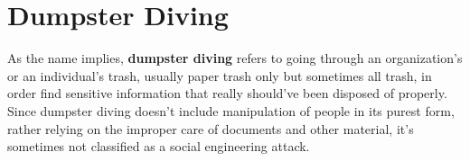 \section{Dumpster Diving}

As the name implies, \textbf{dumpster diving} refers to going through an organization's or an individual's trash, usually paper trash only but sometimes all trash, in order find sensitive information that really should've been disposed of properly. Since dumpster diving doesn't include manipulation of people in its purest form, rather relying on the improper care of documents and other material, it's sometimes not classified as a social engineering attack.




